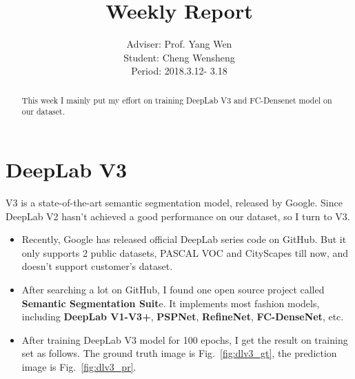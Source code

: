 \documentclass[]{IEEEtran}
\begin{document}
	\title{Weekly Report}
	\author{Adviser: Prof. Yang Wen \\Student: Cheng Wensheng\\ Period: 2018.3.12- 3.18
	}
	\maketitle

\begin{abstract}
	This week I mainly put my effort on training DeepLab V3 and FC-Densenet model on our dataset.
\end{abstract}

\section{DeepLab V3}
	 V3 is a state-of-the-art semantic segmentation model, released by Google. Since DeepLab V2 hasn't achieved a good performance on our dataset, so I turn to V3.
	\begin{itemize}
		\item Recently, Google has released official DeepLab series code on GitHub. But it only supports 2 public datasets, PASCAL VOC and CityScapes till now, and doesn't support customer's dataset.
		\item After searching a lot on GitHub, I found one open source project called \textbf{Semantic Segmentation Suit}e. It implements most fashion models, including \textbf{DeepLab V1-V3+}, \textbf{PSPNet}, \textbf{RefineNet}, \textbf{FC-DenseNet}, etc.
		\item After training DeepLab V3 model for 100 epochs, I get the result on training set as follows. The ground truth image is Fig.~\ref{fig:dlv3_gt}, the prediction image is Fig.~\ref{fig:dlv3_pr}.
	\end{itemize}

\end{document}
